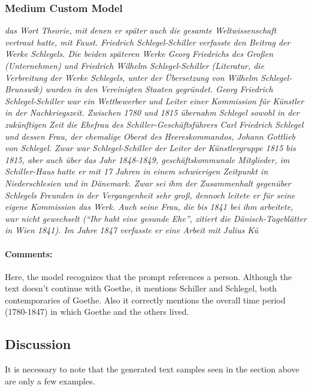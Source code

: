 \documentclass{scrartcl}
\begin{document}
\subsubsection{Medium Custom Model}
{\itshape
 das Wort Theorie, mit denen er später auch die gesamte Weltwissenschaft vertraut hatte, mit Faust.
Friedrich Schlegel-Schiller verfasste den Beitrag der Werke Schlegels.
Die beiden späteren Werke Georg Friedrichs des Großen (Unternehmen) und Friedrich Wilhelm Schlegel-Schiller (Literatur, die Verbreitung der Werke Schlegels, unter der Übersetzung von Wilhelm Schlegel-Brunswik) wurden in den Vereinigten Staaten gegründet.
Georg Friedrich Schlegel-Schiller war ein Wettbewerber und Leiter einer Kommission für Künstler in der Nachkriegszeit.
Zwischen 1780 und 1815 übernahm Schlegel sowohl in der zukünftigen Zeit die Ehefrau des Schiller-Geschäftsführers Carl Friedrich Schlegel und dessen Frau, der ehemalige Oberst des Heereskommandos, Johann Gottlieb von Schlegel.
Zwar war Schlegel-Schiller der Leiter der Künstlergruppe 1815 bis 1815, aber auch über das Jahr 1848-1849, geschäftskommunale Mitglieder, im Schiller-Haus hatte er mit 17 Jahren in einem schwierigen Zeitpunkt in Niederschlesien und in Dänemark.
Zwar sei ihm der Zusammenhalt gegenüber Schlegels Freunden in der Vergangenheit sehr groß, dennoch leitete er für seine eigene Kommission das Werk.
Auch seine Frau, die bis 1841 bei ihm arbeitete, war nicht gewechselt (\enquote{Ihr habt eine gesunde Ehe}, zitiert die Dänisch-Tageblätter in Wien 1841).
Im Jahre 1847 verfasste er eine Arbeit mit Julius Kü
}

\paragraph{Comments:} Here, the model recognizes that the prompt references a person. Although the text doesn't continue with Goethe, it mentions Schiller and Schlegel, both contemporaries of Goethe. Also it correctly mentions the overall time period (1780-1847) in which Goethe and the others lived.

\subsection{Discussion}
It is necessary to note that the generated text samples seen in the section above are only a few examples.
\end{document}
